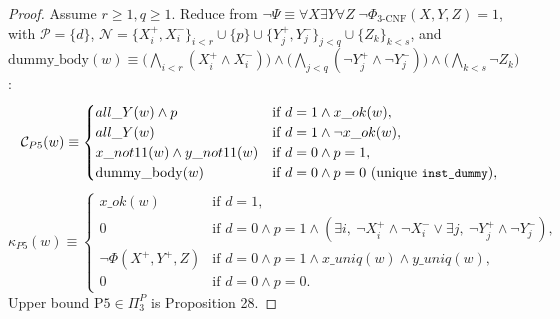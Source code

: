 \documentclass[11pt,a4paper]{article}
\newcommand{\C}{\mathcal{C}}
\newcommand{\N}{\mathcal{N}}
\newcommand{\Prot}{\mathcal{P}}
\newcommand{\code}[1]{\texttt{\small #1}}
\begin{document}
\begin{proof}
Assume $r \ge 1, q \ge 1$. Reduce from $\neg\Psi \equiv \forall X \exists Y \forall Z\;\neg\Phi_{\text{3-CNF}}(X,Y,Z)=1$, with $\Prot = \{d\}$, $\N = \{X_i^+,X_i^-\}_{i<r} \cup \{p\} \cup \{Y_j^+,Y_j^-\}_{j<q} \cup \{Z_k\}_{k<s}$, and $\mathrm{dummy\_body}(w) \equiv \big(\bigwedge_{i<r}(X_i^+ \land X_i^-)\big) \land \big(\bigwedge_{j<q}(\neg Y_j^+ \land \neg Y_j^-)\big) \land \big(\bigwedge_{k<s}\neg Z_k\big)$:
\[
  \C_{P5}(w) \equiv \begin{cases}
    all\_Y(w) \land p & \text{if } d=1 \land x\_ok(w),\\
    all\_Y(w) & \text{if } d=1 \land \neg x\_ok(w),\\
    x\_not11(w) \land y\_not11(w) & \text{if } d=0 \land p=1,\\
    \mathrm{dummy\_body}(w) & \text{if } d=0 \land p=0\ (\text{unique } \code{inst\_dummy}),
  \end{cases}
\]
\[
  \kappa_{P5}(w) \equiv \begin{cases}
    x\_ok(w) & \text{if } d=1,\\
    0 & \text{if } d=0 \land p=1 \land (\exists i,\ \neg X_i^+ \land \neg X_i^- \lor \exists j,\ \neg Y_j^+ \land \neg Y_j^-),\\
    \neg\Phi(X^+, Y^+, Z) & \text{if } d=0 \land p=1 \land x\_uniq(w) \land y\_uniq(w),\\
    0 & \text{if } d=0 \land p=0.
  \end{cases}
\]
Upper bound $\mathrm{P5} \in \Pi_3^P$ is Proposition 28.


\end{proof}
\end{document}
